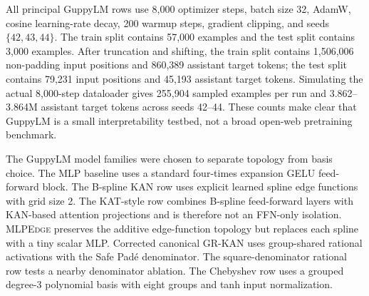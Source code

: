 \documentclass{article}
\newcommand{\modelname}[1]{\textsc{#1}}
\newcommand{\grkan}{\modelname{GR-KAN}}
\newcommand{\mlpedge}{\modelname{MLPEdge}}
\begin{document}
All principal GuppyLM rows use 8,000 optimizer steps, batch size 32, AdamW, cosine learning-rate decay, 200 warmup steps, gradient clipping, and seeds \(\{42,43,44\}\). The train split contains 57,000 examples and the test split contains 3,000 examples. After truncation and shifting, the train split contains 1,506,006 non-padding input positions and 860,389 assistant target tokens; the test split contains 79,231 input positions and 45,193 assistant target tokens. Simulating the actual 8,000-step dataloader gives 255,904 sampled examples per run and 3.862--3.864M assistant target tokens across seeds 42--44. These counts make clear that GuppyLM is a small interpretability testbed, not a broad open-web pretraining benchmark.

The GuppyLM model families were chosen to separate topology from basis choice. The MLP baseline uses a standard four-times expansion GELU feed-forward block. The B-spline KAN row uses explicit learned spline edge functions with grid size 2. The KAT-style row combines B-spline feed-forward layers with KAN-based attention projections and is therefore not an FFN-only isolation. \mlpedge{} preserves the additive edge-function topology but replaces each spline with a tiny scalar MLP. Corrected canonical \grkan{} uses group-shared rational activations with the Safe Pad\'{e} denominator. The square-denominator rational row tests a nearby denominator ablation. The Chebyshev row uses a grouped degree-3 polynomial basis with eight groups and tanh input normalization.
\end{document}
